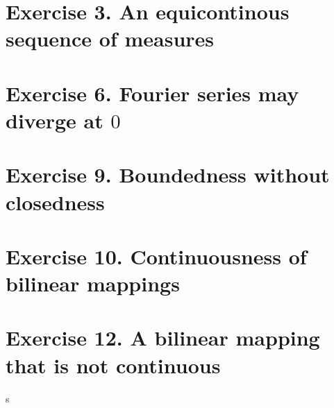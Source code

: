 \section{Exercise 3. An equicontinous sequence of measures}

\section{Exercise 6. Fourier series may diverge at $0$}

\section{Exercise 9. Boundedness without closedness}

\newpage
\section{Exercise 10. Continuousness of bilinear mappings}

\newpage
\section{Exercise 12. A bilinear mapping that is not continuous}
s